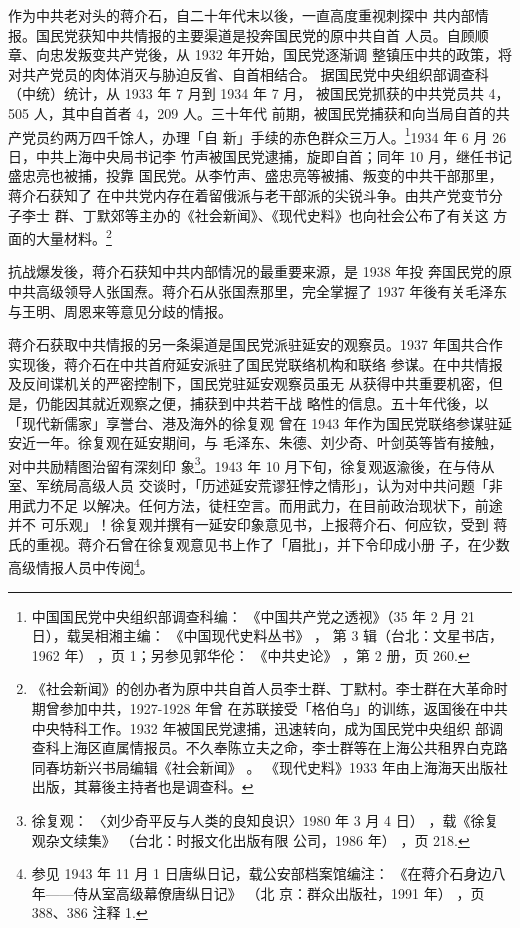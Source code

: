 作为中共老对头的蒋介石，自二十年代末以後，一直高度重视刺探中
共内部情报。国民党获知中共情报的主要渠道是投奔国民党的原中共自首
人员。自顾顺章、向忠发叛变共产党後，从 1932 年开始，国民党逐渐调
整镇压中共的政策，将对共产党员的肉体消灭与胁迫反省、自首相结合。
据国民党中央组织部调查科（中统）统计，从 1933 年 7 月到 1934 年 7 月，
被国民党抓获的中共党员共 4，505 人，其中自首者 4，209 人。三十年代
前期，被国民党捕获和向当局自首的共产党员约两万四千馀人，办理「自
新」手续的赤色群众三万人。\footnote{中国国民党中央组织部调查科编：
《中国共产党之透视》（35 年 2 月 21 日），载吴相湘主编：
《中国现代史料丛书》
，
第 3 辑（台北：文星书店，1962 年）
，页 1；另参见郭华伦：
《中共史论》
，第 2 册，页 260. }1934 年 6 月 26 日，中共上海中央局书记李
竹声被国民党逮捕，旋即自首；同年 10 月，继任书记盛忠亮也被捕，投靠
国民党。从李竹声、盛忠亮等被捕、叛变的中共干部那里，蒋介石获知了
在中共党内存在着留俄派与老干部派的尖锐斗争。由共产党变节分子李士
群、丁默郊等主办的《社会新闻》、《现代史料》也向社会公布了有关这
方面的大量材料。\footnote{《社会新闻》的创办者为原中共自首人员李士群、丁默村。李士群在大革命时期曾参加中共，1927-1928 年曾
在苏联接受「格伯乌」的训练，返国後在中共中央特科工作。1932 年被国民党逮捕，迅速转向，成为国民党中央组织
部调查科上海区直属情报员。不久奉陈立夫之命，李士群等在上海公共租界白克路同春坊新兴书局编辑《社会新闻》
。
《现代史料》1933 年由上海海天出版社出版，其幕後主持者也是调查科。
} 

抗战爆发後，蒋介石获知中共内部情况的最重要来源，是 1938 年投
奔国民党的原中共高级领导人张国焘。蒋介石从张国焘那里，完全掌握了
1937 年後有关毛泽东与王明、周恩来等意见分歧的情报。


蒋介石获取中共情报的另一条渠道是国民党派驻延安的观察员。1937
年国共合作实现後，蒋介石在中共首府延安派驻了国民党联络机构和联络
参谋。在中共情报及反间谍机关的严密控制下，国民党驻延安观察员虽无
从获得中共重要机密，但是，仍能因其就近观察之便，捕获到中共若干战
略性的信息。五十年代後，以「现代新儒家」享誉台、港及海外的徐复观
曾在 1943 年作为国民党联络参谋驻延安近一年。徐复观在延安期间，与
毛泽东、朱德、刘少奇、叶剑英等皆有接触，对中共励精图治留有深刻印
象\footnote{徐复观： 〈刘少奇平反与人类的良知良识〉1980 年 3 月 4 日）
，载《徐复观杂文续集》 （台北：时报文化出版有限
公司，1986 年） ，页 218. }。1943 年 10 月下旬，徐复观返渝後，在与侍从室、军统局高级人员
交谈时，「历述延安荒谬狂悖之情形」，认为对中共问题「非用武力不足
以解决。任何方法，徒枉空言。而用武力，在目前政治现状下，前途并不
可乐观」！徐复观并撰有一延安印象意见书，上报蒋介石、何应钦，受到
蒋氏的重视。蒋介石曾在徐复观意见书上作了「眉批」，并下令印成小册
子，在少数高级情报人员中传阅\footnote{参见 1943 年 11 月 1 日唐纵日记，载公安部档案馆编注：
《在蒋介石身边八年——侍从室高级幕僚唐纵日记》
（北
京：群众出版社，1991 年）
，页 388、386 注释 1. }。


